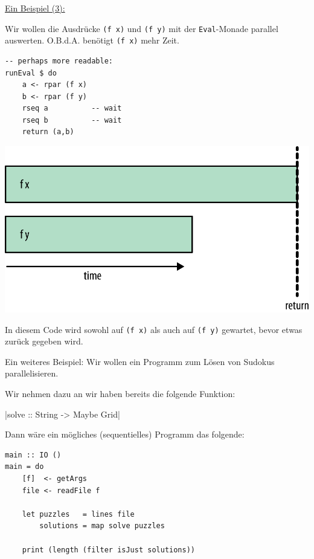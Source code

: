 \documentclass{beamer}
\begin{document}
\begin{frame}[fragile]
\underline{Ein Beispiel (3):}\smallskip

Wir wollen die Ausdrücke \texttt{(f x)} und \texttt{(f y)} mit der \texttt{Eval}-Monade parallel auswerten. O.B.d.A. benötigt \texttt{(f x)} mehr Zeit.

\begin{multicols}{2}
\begin{verbatim}
-- perhaps more readable:
runEval $ do
    a <- rpar (f x)
    b <- rpar (f y)
    rseq a          -- wait
    rseq b          -- wait
    return (a,b)
\end{verbatim}
\columnbreak
\includegraphics[scale=0.7]{evalmonad_03.png}
\end{multicols}

In diesem Code wird sowohl auf \texttt{(f x)} als auch auf \texttt{(f y)} gewartet, 
bevor etwas zurück gegeben wird.
\end{frame}


\begin{frame}[fragile]
Ein weiteres Beispiel: Wir wollen ein Programm zum Lösen von Sudokus parallelisieren.

Wir nehmen dazu an wir haben bereits die folgende Funktion:

|solve :: String -> Maybe Grid|
\pause

Dann wäre ein mögliches (sequentielles) Programm das folgende:

\begin{verbatim}
main :: IO ()
main = do
    [f]  <- getArgs
    file <- readFile f

    let puzzles   = lines file
        solutions = map solve puzzles

    print (length (filter isJust solutions))
\end{verbatim}
\end{frame}
\end{document}
